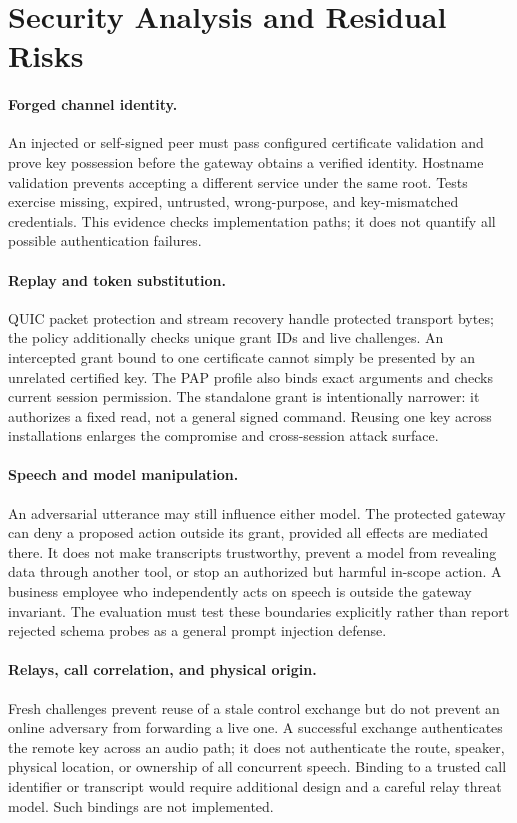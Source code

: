 \section{Security Analysis and Residual Risks}
\label{sec:security}
\paragraph{Forged channel identity.}
An injected or self-signed peer must pass configured certificate validation
and prove key possession before the gateway obtains a verified identity.
Hostname validation prevents accepting a different service under the same
root. Tests exercise missing, expired, untrusted, wrong-purpose, and
key-mismatched credentials. This evidence checks implementation paths; it
does not quantify all possible authentication failures.

\paragraph{Replay and token substitution.}
QUIC packet protection and stream recovery handle protected transport bytes;
the policy additionally checks unique grant IDs and live challenges. An
intercepted grant bound to one certificate cannot simply be presented by an
unrelated certified key. The PAP profile also binds exact arguments and checks
current session permission. The standalone grant is intentionally narrower:
it authorizes a fixed read, not a general signed command. Reusing one key
across installations enlarges the compromise and cross-session attack surface.

\paragraph{Speech and model manipulation.}
An adversarial utterance may still influence either model. The protected
gateway can deny a proposed action outside its grant, provided all effects
are mediated there. It does not make transcripts trustworthy, prevent a
model from revealing data through another tool, or stop an authorized but
harmful in-scope action. A business employee who independently acts on speech
is outside the gateway invariant. The evaluation must test these boundaries
explicitly rather than report rejected schema probes as a general prompt
injection defense.

\paragraph{Relays, call correlation, and physical origin.}
Fresh challenges prevent reuse of a stale control exchange but do not prevent
an online adversary from forwarding a live one. A successful exchange
authenticates the remote key across an audio path; it does not authenticate
the route, speaker, physical location, or ownership of all concurrent speech.
Binding to a trusted call identifier or transcript would require additional
design and a careful relay threat model. Such bindings are not implemented.

